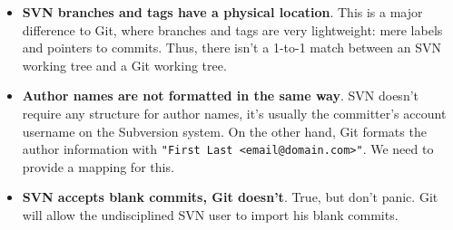 \documentclass{../common/tufte-latex/tufte-handout}
\begin{document}
\begin{itemize}
 \item \textbf{SVN branches and tags have a physical location}. This is a major difference to Git, where branches and tags are very lightweight: mere labels and pointers to commits. Thus, there isn't a 1-to-1 match between an SVN working tree and a Git working tree.
 \item \textbf{Author names are not formatted in the same way}. SVN doesn't require any structure for author names, it's usually the committer's account username on the Subversion system. On the other hand, Git formats the author information with \texttt{"First Last <email@domain.com>"}. We need to provide a mapping for this.
 \item \textbf{SVN accepts blank commits, Git doesn't}. True, but don't panic. Git will allow the undisciplined SVN user to import his blank commits.
\end{itemize}



\end{document}
